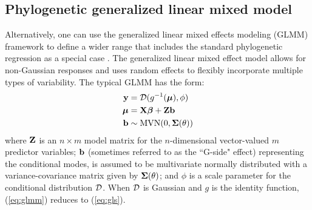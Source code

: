 \documentclass[12pt]{article}
\begin{document}


\subsection*{Phylogenetic generalized linear mixed model}
Alternatively, one can use the generalized linear mixed effects modeling (GLMM) framework to define a wider range that includes the standard phylogenetic regression as a special case \citep{lynch1991methods}.
The generalized linear mixed effect model allows for non-Gaussian responses and uses random effects to flexibly incorporate multiple types of variability.
The typical GLMM has the form:
\newcommand{\dist}{{\cal D}}
\begin{equation}
\begin{aligned}
\bY & = \dist(g^{-1}(\bmu), \phi) \\
\bmu & = \bX \bbeta + \bZ \bb  \\
\bb & \sim \textrm{MVN}(0, \bSigma(\theta))  \\
\label{eq:glmm}
\end{aligned}
\end{equation}
where ${\mathbf Z}$ is an $n \times m$ model matrix for the $n$-dimensional vector-valued $m$ predictor variables; ${\mathbf b}$ (sometimes referred to as the ``G-side" effect) representing the conditional modes, is assumed to be multivariate normally distributed with a variance-covariance matrix given by ${\boldsymbol \Sigma}(\theta)$; and $\phi$ is a scale parameter for the conditional distribution $\dist$.
When $\dist$ is Gaussian and $g$ is the identity function, (\ref{eq:glmm}) reduces to (\ref{eq:gls}).
\end{document}
